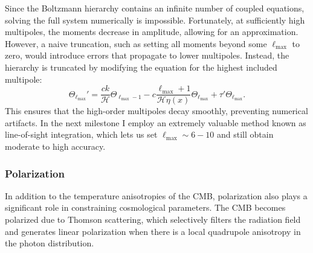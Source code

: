 \documentclass{aa}
\numberwithin{equation}{section}
\numberwithin{table}{section}
\numberwithin{figure}{section}
\begin{document}
Since the Boltzmann hierarchy contains an infinite number of coupled equations, solving the full system numerically is impossible. Fortunately, at sufficiently high multipoles, the moments decrease in amplitude, allowing for an approximation. However, a naive truncation, such as setting all moments beyond some $\ell_{\max}$ to zero, would introduce errors that propagate to lower multipoles. Instead, the hierarchy is truncated by modifying the equation for the highest included multipole:
\begin{equation} 
  \Theta_{\ell_{\max}}' = \frac{ck}{\mathcal{H}} \Theta_{\ell_{\max}-1} - c \frac{\ell_{\max}+1}{\mathcal{H} \eta(x)} \Theta_{\ell_{\max}} + \tau' \Theta_{\ell_{\max}}. 
\end{equation}
This ensures that the high-order multipoles decay smoothly, preventing numerical artifacts. In the next milestone I employ an extremely valuable method known as line-of-sight integration, which lets us set $\ell_{\max} \sim 6-10$ and still obtain moderate to high accuracy.


\subsubsection{Polarization}
In addition to the temperature anisotropies of the CMB, polarization also plays a significant role in constraining cosmological parameters. The CMB becomes polarized due to Thomson scattering, which selectively filters the radiation field and generates linear polarization when there is a local quadrupole anisotropy in the photon distribution.
\end{document}
